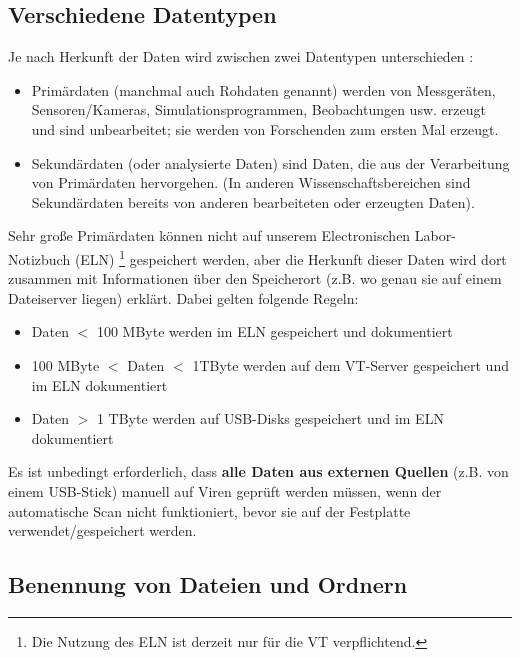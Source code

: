 \subsection{Verschiedene Datentypen}
Je nach Herkunft der Daten wird zwischen zwei Datentypen unterschieden \cite{gitelman2013}:
\begin{itemize}
  \item Primärdaten (manchmal auch Rohdaten genannt) werden von Messgeräten,
        Sensoren/Kameras, Simulationsprogrammen, Beobachtungen usw. erzeugt
        und sind unbearbeitet; sie werden von Forschenden zum ersten Mal erzeugt.
  \item Sekundärdaten (oder analysierte Daten) sind Daten, die aus der
        Verarbeitung von Primärdaten hervorgehen. (In anderen
        Wissenschaftsbereichen sind Sekundärdaten bereits von anderen
        bearbeiteten oder erzeugten Daten).
\end{itemize}
Sehr große Primärdaten können nicht auf unserem Electronischen Labor-Notizbuch (ELN)%
  \footnote{%
    Die Nutzung des ELN ist derzeit nur für die VT verpflichtend.
  }%
gespeichert werden, aber die Herkunft dieser Daten wird dort zusammen mit
Informationen über den Speicherort (z.B. wo genau sie auf einem Dateiserver
liegen) erklärt. Dabei gelten folgende Regeln:
\begin{itemize}
  \item Daten $<$ 100 MByte werden im ELN gespeichert und dokumentiert
  \item 100 MByte $<$ Daten $<$ 1TByte werden auf dem VT-Server gespeichert und im
        ELN dokumentiert
  \item Daten $>$ 1 TByte werden auf USB-Disks gespeichert und im ELN dokumentiert
\end{itemize}
Es ist unbedingt erforderlich, dass \textbf{alle Daten aus externen Quellen} (z.B. von einem USB-Stick) manuell auf Viren geprüft werden müssen, wenn der automatische Scan nicht funktioniert, bevor sie auf der Festplatte verwendet/gespeichert werden.

\subsection{Benennung von Dateien und Ordnern }


